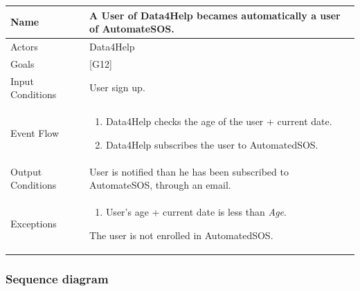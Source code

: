 \documentclass{article}
\begin{document}
\begin{center}
    \begin{tabular}{ | l | p{10cm} |}
    \hline
    Name & A User of Data4Help becames automatically a user of AutomateSOS. \\ \hline
    Actors & Data4Help\\ \hline
   	Goals & {[G12]}\\ \hline
    Input Conditions & User sign up.\\ \hline
    Event Flow & \begin{enumerate}
    	\item Data4Help checks the age of the user + current date.
    	\item Data4Help subscribes the user to AutomatedSOS.
    \end{enumerate} \\ \hline
    Output Conditions & User is notified than he has been subscribed to AutomateSOS, through an email. \\ \hline
    Exceptions & \begin{enumerate}
    	\item User's age + current date is less than \emph{Age}.
\end{enumerate}  The user is not enrolled in AutomatedSOS.   \\ \hline
    \end{tabular}
\end{center}\newpage

\subsubsection{Sequence diagram}
\end{document}
